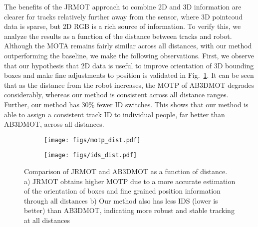 \documentclass[letterpaper, 10 pt, conference]{ieeeconf}
\newcommand{\methodname}{{JRMOT}\xspace}
\begin{document}
The benefits of the \methodname approach to combine 2D and 3D information are clearer for tracks relatively further away from the sensor, where 3D pointcoud data is sparse, but 2D RGB is a rich source of information. To verify this, we analyze the results as a function of the distance between tracks and robot. Although the MOTA remains fairly similar across all distances, with our method outperforming the baseline, we make the following observations. First, we observe that our hypothesis that 2D data is useful to improve orientation of 3D bounding boxes and make fine adjustments to position is validated in Fig.~\ref{fig:dist_performance}. It can be seen that as the distance from the robot increases, the MOTP of AB3DMOT degrades considerably, whereas our method is consistent across all distance ranges. Further, our method has 30\% fewer ID switches. This shows that our method is able to assign a consistent track ID to individual people, far better than AB3DMOT, across all distances. 
\begin{figure}[h]
\centering
\begin{subfigure}{0.23\textwidth}
\texttt{[image: figs/motp\_dist.pdf]}
\caption{}
\end{subfigure}
\centering
\begin{subfigure}{0.23\textwidth}
\centering
\texttt{[image: figs/ids\_dist.pdf]}
\caption{}
\end{subfigure}
\caption{Comparison of \methodname and AB3DMOT as a function of distance. a) \methodname obtains higher MOTP due to a more accurate estimation of the orientation of boxes and fine grained position information through all distances b) Our method also has less IDS (lower is better) than AB3DMOT, indicating more robust and stable tracking at all distances}
\label{fig:dist_performance}
\end{figure}
\end{document}
